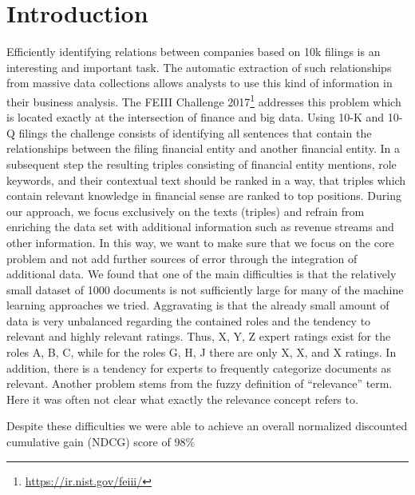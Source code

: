 \section{Introduction}
Efficiently identifying relations between companies based on 10k filings is an interesting and important task.
The automatic extraction of such relationships from massive data collections allows analysts to use this kind of information in their business analysis.
The FEIII Challenge 2017\footnote{\url{https://ir.nist.gov/feiii/}} addresses this problem which is located exactly at the intersection of finance and big data.
Using 10-K and 10-Q filings the challenge consists of identifying all sentences that contain the relationships between the filing financial entity and another financial entity.
In a subsequent step the resulting triples consisting of financial entity mentions, role keywords, and their contextual text should be ranked in a way, that triples which contain relevant knowledge in financial sense are ranked to top positions.
During our approach, we focus exclusively on the texts (triples) and refrain from enriching the data set with additional information such as revenue streams and other information.
In this way, we want to make sure that we focus on the core problem and not add further sources of error through the integration of additional data.
We found that one of the main difficulties is that the relatively small dataset of 1000 documents is not sufficiently large for many of the machine learning approaches we tried. 
Aggravating is that the already small amount of data is very unbalanced regarding the contained roles and the tendency to relevant and highly relevant ratings.
Thus, X, Y, Z expert ratings exist for the roles A, B, C, while for the roles G, H, J there are only X, X, and X ratings.  
In addition, there is a tendency for experts to frequently categorize documents as relevant.
Another problem stems from the fuzzy definition of ``relevance'' term.
Here it was often not clear what exactly the relevance concept refers to.

Despite these difficulties we were able to achieve an overall normalized discounted cumulative gain (NDCG) score of 98\%

